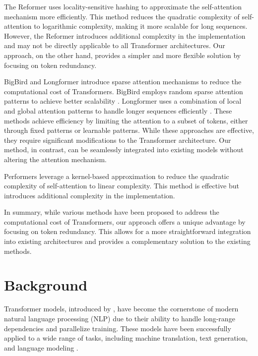 \documentclass{article} %
\begin{document}
The Reformer \citep{Kitaev2020ReformerTE} uses locality-sensitive hashing to approximate the self-attention mechanism more efficiently. This method reduces the quadratic complexity of self-attention to logarithmic complexity, making it more scalable for long sequences. However, the Reformer introduces additional complexity in the implementation and may not be directly applicable to all Transformer architectures. Our approach, on the other hand, provides a simpler and more flexible solution by focusing on token redundancy.

BigBird \citep{Zaheer2020BigBT} and Longformer \citep{Beltagy2020LongformerTL} introduce sparse attention mechanisms to reduce the computational cost of Transformers. BigBird employs random sparse attention patterns to achieve better scalability \citep{Mamakas2022ProcessingLL}. Longformer uses a combination of local and global attention patterns to handle longer sequences efficiently \citep{Tay2020EfficientTA}. These methods achieve efficiency by limiting the attention to a subset of tokens, either through fixed patterns or learnable patterns. While these approaches are effective, they require significant modifications to the Transformer architecture. Our method, in contrast, can be seamlessly integrated into existing models without altering the attention mechanism.

Performers \citep{Choromanski2020RethinkingAW} leverage a kernel-based approximation to reduce the quadratic complexity of self-attention to linear complexity. This method is effective but introduces additional complexity in the implementation.

In summary, while various methods have been proposed to address the computational cost of Transformers, our approach offers a unique advantage by focusing on token redundancy. This allows for a more straightforward integration into existing architectures and provides a complementary solution to the existing methods.

\section{Background}
\label{sec:background}

Transformer models, introduced by \citet{vaswani2017attention}, have become the cornerstone of modern natural language processing (NLP) due to their ability to handle long-range dependencies and parallelize training. These models have been successfully applied to a wide range of tasks, including machine translation, text generation, and language modeling \citep{radford2019language, gpt4}.
\end{document}
